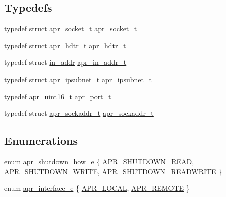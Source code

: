 \subsection*{Typedefs}
\begin{DoxyCompactItemize}
\item 
typedef struct \mbox{\hyperlink{structapr__socket__t}{apr\+\_\+socket\+\_\+t}} \mbox{\hyperlink{group__apr__network__io_ga49262b223e7434746e1f1737659aa2c3}{apr\+\_\+socket\+\_\+t}}
\item 
typedef struct \mbox{\hyperlink{structapr__hdtr__t}{apr\+\_\+hdtr\+\_\+t}} \mbox{\hyperlink{group__apr__network__io_ga97887d5358a9c79c241ccafab61d8ff5}{apr\+\_\+hdtr\+\_\+t}}
\item 
typedef struct \mbox{\hyperlink{structin__addr}{in\+\_\+addr}} \mbox{\hyperlink{group__apr__network__io_gad30d6c55a354a9a2e0a8747abb0c8176}{apr\+\_\+in\+\_\+addr\+\_\+t}}
\item 
typedef struct \mbox{\hyperlink{group__apr__network__io_gac86ee04eb80f938902095d1d0a67c324}{apr\+\_\+ipsubnet\+\_\+t}} \mbox{\hyperlink{group__apr__network__io_gac86ee04eb80f938902095d1d0a67c324}{apr\+\_\+ipsubnet\+\_\+t}}
\item 
typedef apr\+\_\+uint16\+\_\+t \mbox{\hyperlink{group__apr__network__io_gaa670a71960f6eb4fe0d0de2a1e7aba03}{apr\+\_\+port\+\_\+t}}
\item 
typedef struct \mbox{\hyperlink{structapr__sockaddr__t}{apr\+\_\+sockaddr\+\_\+t}} \mbox{\hyperlink{group__apr__network__io_ga373fb6f32d0875c5deb648b779c8a709}{apr\+\_\+sockaddr\+\_\+t}}
\end{DoxyCompactItemize}
\subsection*{Enumerations}
\begin{DoxyCompactItemize}
\item 
enum \mbox{\hyperlink{group__apr__network__io_gae2130f1fa2d0db58c5c3c9c73d9b4009}{apr\+\_\+shutdown\+\_\+how\+\_\+e}} \{ \mbox{\hyperlink{group__apr__network__io_ggae2130f1fa2d0db58c5c3c9c73d9b4009a88d0661d35eea5319715d6ca69265b01}{A\+P\+R\+\_\+\+S\+H\+U\+T\+D\+O\+W\+N\+\_\+\+R\+E\+AD}}, 
\mbox{\hyperlink{group__apr__network__io_ggae2130f1fa2d0db58c5c3c9c73d9b4009a5e335b392088e14df65d1bd5e0db7c46}{A\+P\+R\+\_\+\+S\+H\+U\+T\+D\+O\+W\+N\+\_\+\+W\+R\+I\+TE}}, 
\mbox{\hyperlink{group__apr__network__io_ggae2130f1fa2d0db58c5c3c9c73d9b4009add172f55ff5ee7b930683a3903c99768}{A\+P\+R\+\_\+\+S\+H\+U\+T\+D\+O\+W\+N\+\_\+\+R\+E\+A\+D\+W\+R\+I\+TE}}
 \}
\item 
enum \mbox{\hyperlink{group__apr__network__io_ga1982f44f48fdf00a8bd754bc7b773edc}{apr\+\_\+interface\+\_\+e}} \{ \mbox{\hyperlink{group__apr__network__io_gga1982f44f48fdf00a8bd754bc7b773edca6c23a4bf48b8f93dff08adf827382616}{A\+P\+R\+\_\+\+L\+O\+C\+AL}}, 
\mbox{\hyperlink{group__apr__network__io_gga1982f44f48fdf00a8bd754bc7b773edcaeb8be70b031f06a513ac0ebcaa5bac8a}{A\+P\+R\+\_\+\+R\+E\+M\+O\+TE}}
 \}
\end{DoxyCompactItemize}
